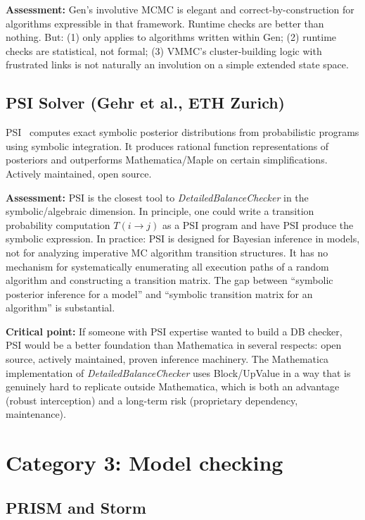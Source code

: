 \documentclass[11pt,a4paper]{article}
\newcommand{\DBC}{\textit{DetailedBalanceChecker}}
\begin{document}
\textbf{Assessment:}  Gen's involutive MCMC is elegant and correct-by-construction
for algorithms expressible in that framework.  Runtime checks are better than
nothing.  But: (1) only applies to algorithms written within Gen; (2) runtime
checks are statistical, not formal; (3) VMMC's cluster-building logic with
frustrated links is not naturally an involution on a simple extended state space.

\subsection{PSI Solver (Gehr et al., ETH Zurich)}

PSI~\cite{Gehr2016} computes exact symbolic posterior distributions from
probabilistic programs using symbolic integration.  It produces rational function
representations of posteriors and outperforms Mathematica/Maple on certain
simplifications.  Actively maintained, open source.

\textbf{Assessment:}  PSI is the closest tool to \DBC{} in the symbolic/algebraic
dimension.  In principle, one could write a transition probability computation
$T(i\to j)$ as a PSI program and have PSI produce the symbolic expression.
In practice: PSI is designed for Bayesian inference in models, not for analyzing
imperative MC algorithm transition structures.  It has no mechanism for
systematically enumerating all execution paths of a random algorithm and
constructing a transition matrix.  The gap between ``symbolic posterior inference
for a model'' and ``symbolic transition matrix for an algorithm'' is substantial.

\textbf{Critical point:}  If someone with PSI expertise wanted to build a DB
checker, PSI would be a better foundation than Mathematica in several respects:
open source, actively maintained, proven inference machinery.  The Mathematica
implementation of \DBC{} uses Block/UpValue in a way that is genuinely hard to
replicate outside Mathematica, which is both an advantage (robust interception)
and a long-term risk (proprietary dependency, maintenance).

\section{Category 3: Model checking}
\label{sec:modelchecking}

\subsection{PRISM and Storm}
\end{document}
